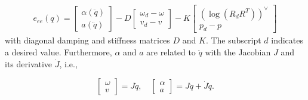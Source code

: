 \documentclass[a4paper, 10pt, conference]{ieeeconf}
\begin{document}
      \begin{align} \label{eq:eetask} e_{ee}(q) = 
    \begin{bmatrix} \alpha(\ddot{q}) \\ a(\ddot{q}) \end{bmatrix}
    - D \begin{bmatrix} \omega_d - {\omega} \\ v_d - v \end{bmatrix}  - K \begin{bmatrix}(\log({R}_dR^T))^{\vee }  \\p_d - {p}  \end{bmatrix}
        \end{align} with diagonal damping and stiffness matrices $D$ and $K$. The subscript $d$ indicates a desired value. Furthermore, $\alpha$ and $a$ are related to $\ddot{q}$ with the Jacobian $J$ and its derivative $\dot{J}$, i.e.,

    \begin{equation}\label{eq:jacobian}
    \begin{bmatrix} \omega \\ v \end{bmatrix}=J\dot{q},
    \quad 
    \begin{bmatrix} \alpha \\ a \end{bmatrix}=J\ddot{q}+\dot{J}\dot{q}.
    \end{equation}
\end{document}
